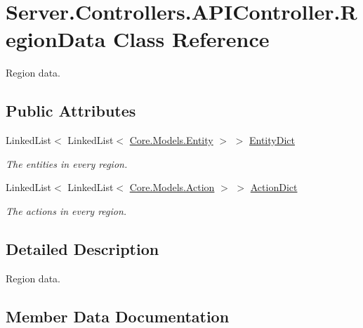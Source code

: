 \hypertarget{classServer_1_1Controllers_1_1APIController_1_1RegionData}{}\section{Server.\+Controllers.\+A\+P\+I\+Controller.\+Region\+Data Class Reference}
\label{classServer_1_1Controllers_1_1APIController_1_1RegionData}


Region data.  


\subsection*{Public Attributes}
\begin{DoxyCompactItemize}
\item 
Linked\+List$<$ Linked\+List$<$ \hyperlink{classCore_1_1Models_1_1Entity}{Core.\+Models.\+Entity} $>$ $>$ \hyperlink{classServer_1_1Controllers_1_1APIController_1_1RegionData_a515c8be86ead173ab0e21c57a93cd174}{Entity\+Dict}
\begin{DoxyCompactList}\small\item\em The entities in every region. \end{DoxyCompactList}\item 
Linked\+List$<$ Linked\+List$<$ \hyperlink{classCore_1_1Models_1_1Action}{Core.\+Models.\+Action} $>$ $>$ \hyperlink{classServer_1_1Controllers_1_1APIController_1_1RegionData_a15b7109e6735a6e66ed251c195aaf937}{Action\+Dict}
\begin{DoxyCompactList}\small\item\em The actions in every region. \end{DoxyCompactList}\end{DoxyCompactItemize}


\subsection{Detailed Description}
Region data. 



\subsection{Member Data Documentation}
\hypertarget{classServer_1_1Controllers_1_1APIController_1_1RegionData_a15b7109e6735a6e66ed251c195aaf937}{}
